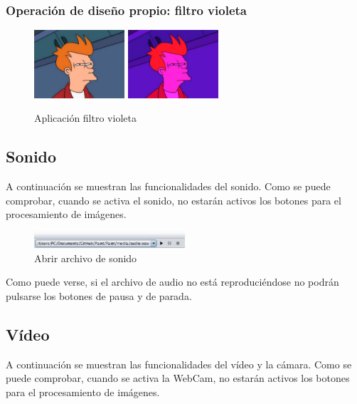 \subsubsection{Operación de diseño propio: filtro violeta}
\vskip0.3cm
\begin{figure}[H]
 \centering
  \includegraphics[width=0.3\textwidth]{imagenes/Fry.jpg}
  \includegraphics[width=0.3\textwidth]{imagenes/fryVioleta.jpg}
 \caption{Aplicación filtro violeta}
 \label{diseño}
 \end{figure}
\subsection{Sonido}
A continuación se muestran las funcionalidades del sonido. Como se puede comprobar, cuando se activa el sonido, no estarán activos los botones para el procesamiento de imágenes.
\vskip0.3cm
\begin{figure}[H]
 \centering
  \includegraphics[width=0.5\textwidth]{sonido/archivoAbierto.png}
 \caption{Abrir archivo de sonido}
 \label{diseño}
 \end{figure}
Como puede verse, si el archivo de audio no está reproduciéndose no podrán pulsarse los botones de pausa y de parada.
\subsection{Vídeo}
A continuación se muestran las funcionalidades del vídeo y la cámara. Como se puede comprobar, cuando se activa la WebCam, no estarán activos los botones para el procesamiento de imágenes.
